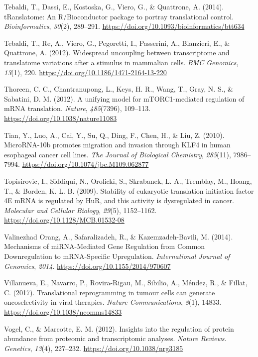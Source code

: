 \documentclass[12pt,openany]{book}
\begin{document}
\hypertarget{ref-Tebaldi2014}{}
Tebaldi, T., Dassi, E., Kostoska, G., Viero, G., \& Quattrone, A.
(2014). tRanslatome: An R/Bioconductor package to portray translational
control. \emph{Bioinformatics}, \emph{30}(2), 289--291.
\url{https://doi.org/10.1093/bioinformatics/btt634}

\hypertarget{ref-Tebaldi2012}{}
Tebaldi, T., Re, A., Viero, G., Pegoretti, I., Passerini, A., Blanzieri,
E., \& Quattrone, A. (2012). Widespread uncoupling between transcriptome
and translatome variations after a stimulus in mammalian cells.
\emph{BMC Genomics}, \emph{13}(1), 220.
\url{https://doi.org/10.1186/1471-2164-13-220}

\hypertarget{ref-Thoreen2012}{}
Thoreen, C. C., Chantranupong, L., Keys, H. R., Wang, T., Gray, N. S.,
\& Sabatini, D. M. (2012). A unifying model for mTORC1-mediated
regulation of mRNA translation. \emph{Nature}, \emph{485}(7396),
109--113. \url{https://doi.org/10.1038/nature11083}

\hypertarget{ref-Tian2010}{}
Tian, Y., Luo, A., Cai, Y., Su, Q., Ding, F., Chen, H., \& Liu, Z.
(2010). MicroRNA-10b promotes migration and invasion through KLF4 in
human esophageal cancer cell lines. \emph{The Journal of Biological
Chemistry}, \emph{285}(11), 7986--7994.
\url{https://doi.org/10.1074/jbc.M109.062877}

\hypertarget{ref-Topisirovic2009}{}
Topisirovic, I., Siddiqui, N., Orolicki, S., Skrabanek, L. A., Tremblay,
M., Hoang, T., \& Borden, K. L. B. (2009). Stability of eukaryotic
translation initiation factor 4E mRNA is regulated by HuR, and this
activity is dysregulated in cancer. \emph{Molecular and Cellular
Biology}, \emph{29}(5), 1152--1162.
\url{https://doi.org/10.1128/MCB.01532-08}

\hypertarget{ref-ValinezhadOrang2014}{}
Valinezhad Orang, A., Safaralizadeh, R., \& Kazemzadeh-Bavili, M.
(2014). Mechanisms of miRNA-Mediated Gene Regulation from Common
Downregulation to mRNA-Specific Upregulation. \emph{International
Journal of Genomics}, \emph{2014}.
\url{https://doi.org/10.1155/2014/970607}

\hypertarget{ref-Villanueva2017}{}
Villanueva, E., Navarro, P., Rovira-Rigau, M., Sibilio, A., Méndez, R.,
\& Fillat, C. (2017). Translational reprogramming in tumour cells can
generate oncoselectivity in viral therapies. \emph{Nature
Communications}, \emph{8}(1), 14833.
\url{https://doi.org/10.1038/ncomms14833}

\hypertarget{ref-Vogel2012}{}
Vogel, C., \& Marcotte, E. M. (2012). Insights into the regulation of
protein abundance from proteomic and transcriptomic analyses.
\emph{Nature Reviews. Genetics}, \emph{13}(4), 227--232.
\url{https://doi.org/10.1038/nrg3185}
\end{document}
